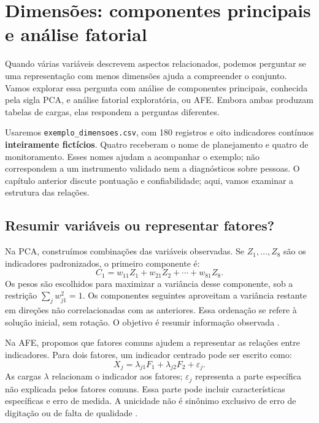 \chapter{Dimensões: componentes principais e análise fatorial}
\label{cap:dimensoes}

Quando várias variáveis descrevem aspectos relacionados, podemos perguntar se uma representação com menos dimensões ajuda a compreender o conjunto. Vamos explorar essa pergunta com análise de componentes principais, conhecida pela sigla PCA, e análise fatorial exploratória, ou AFE. Embora ambas produzam tabelas de cargas, elas respondem a perguntas diferentes.

Usaremos \texttt{exemplo\_dimensoes.csv}, com 180 registros e oito indicadores contínuos \textbf{inteiramente fictícios}. Quatro receberam o nome de planejamento e quatro de monitoramento. Esses nomes ajudam a acompanhar o exemplo; não correspondem a um instrumento validado nem a diagnósticos sobre pessoas. O capítulo anterior discute pontuação e confiabilidade; aqui, vamos examinar a estrutura das relações.

\section{Resumir variáveis ou representar fatores?}

Na PCA, construímos combinações das variáveis observadas. Se $Z_1,\ldots,Z_8$ são os indicadores padronizados, o primeiro componente é:
\[
C_1=w_{11}Z_1+w_{21}Z_2+\cdots+w_{81}Z_8.
\]
Os pesos são escolhidos para maximizar a variância desse componente, sob a restrição $\sum_jw_{j1}^2=1$. Os componentes seguintes aproveitam a variância restante em direções não correlacionadas com as anteriores. Essa ordenação se refere à solução inicial, sem rotação. O objetivo é resumir informação observada \parencite{RevelleComponentes}.

Na AFE, propomos que fatores comuns ajudem a representar as relações entre indicadores. Para dois fatores, um indicador centrado pode ser escrito como:
\[
X_j=\lambda_{j1}F_1+\lambda_{j2}F_2+\varepsilon_j.
\]
As cargas $\lambda$ relacionam o indicador aos fatores; $\varepsilon_j$ representa a parte específica não explicada pelos fatores comuns. Essa parte pode incluir características específicas e erro de medida. A unicidade não é sinônimo exclusivo de erro de digitação ou de falta de qualidade \parencite{RFatorial}.

